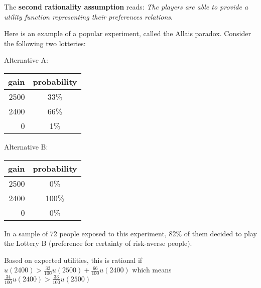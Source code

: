 \documentclass[../main.tex]{subfiles}
\begin{document}
The \textbf{second rationality assumption} reads: \textit{The players are able to provide a utility function representing their preferences relations}.

\begin{example}
    Here is an example of a popular experiment, called the Allais paradox. Consider the following two lotteries:

    Alternative A:
    \begin{center}
        \begin{tabular}{|r|c|}
            \hline
            gain & probability \\\hline
            2500 & 33\%        \\\hline
            2400 & 66\%        \\\hline
            0    & 1\%         \\\hline
        \end{tabular}
    \end{center}
    Alternative B:
    \begin{center}
        \begin{tabular}{|r|c|}
            \hline
            gain & probability \\\hline
            2500 & 0\%         \\\hline
            2400 & 100\%       \\\hline
            0    & 0\%         \\\hline
        \end{tabular}
    \end{center}
    In a sample of 72 people exposed to this experiment, 82\% of them decided to play the Lottery B (preference for certainty of risk-averse people).

    Based on expected utilities, this is rational if $u(2400) >\frac{33}{100} u(2500) + \frac{66}{100} u(2400)$ which means $\frac{34}{100} u(2400) > \frac{33}{100} u(2500)$
\end{example}
\end{document}
